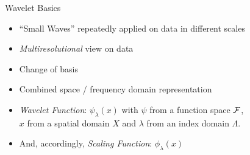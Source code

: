\documentclass{beamer}
\begin{document}
\begin{frame}{Wavelet Basics}

  \begin{itemize}
  \item ``Small Waves'' repeatedly applied on data in different scales
  \item \emph{Multiresolutional} view on data
  \item Change of basis
  \item Combined space / frequency domain representation
  \end{itemize}

  \pause
  \begin{itemize}
  \item \emph{Wavelet Function}: $\psi_\lambda (x)$ with $\psi$ from a function
    space $\cal F$,\\
    $x$ from a spatial domain $X$ and $\lambda$ from an index domain $\Lambda$.
  \item And, accordingly, \emph{Scaling Function}:  $\phi_\lambda (x)$  
  \end{itemize}
\end{frame}
\end{document}
